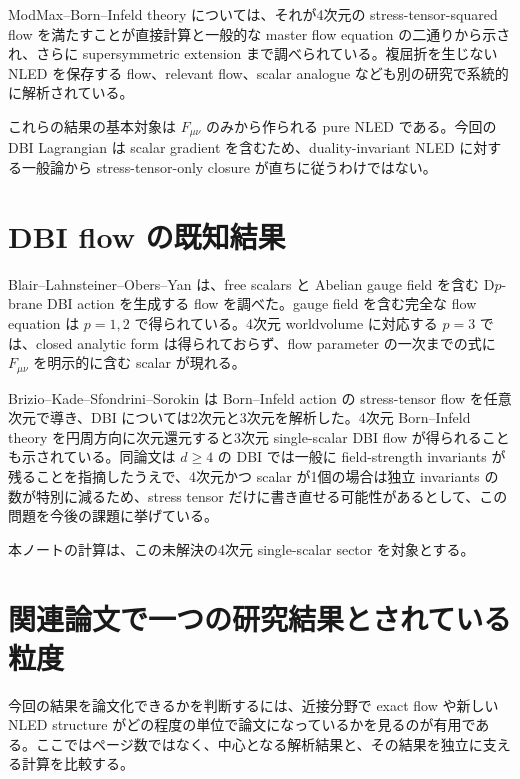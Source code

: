 \documentclass[a4paper,11pt]{ltjsreport}
\begin{document}
ModMax--Born--Infeld theory については、それが4次元の stress-tensor-squared flow を満たすことが直接計算と一般的な master flow equation の二通りから示され、さらに supersymmetric extension まで調べられている\cite{Ferko2022ModMax}。複屈折を生じない NLED を保存する flow、relevant flow、scalar analogue なども別の研究で系統的に解析されている\cite{Ferko2023b}。

これらの結果の基本対象は $F_{\mu\nu}$ のみから作られる pure NLED である。今回の DBI Lagrangian は scalar gradient を含むため、duality-invariant NLED に対する一般論から stress-tensor-only closure が直ちに従うわけではない。

\section{DBI flow の既知結果}

Blair--Lahnsteiner--Obers--Yan は、free scalars と Abelian gauge field を含む D$p$-brane DBI action を生成する flow を調べた\cite{Blair2025}。gauge field を含む完全な flow equation は $p=1,2$ で得られている。4次元 worldvolume に対応する $p=3$ では、closed analytic form は得られておらず、flow parameter の一次までの式に $F_{\mu\nu}$ を明示的に含む scalar が現れる。

Brizio--Kade--Sfondrini--Sorokin は Born--Infeld action の stress-tensor flow を任意次元で導き、DBI については2次元と3次元を解析した\cite{Brizio2026}。4次元 Born--Infeld theory を円周方向に次元還元すると3次元 single-scalar DBI flow が得られることも示されている。同論文は $d\geq4$ の DBI では一般に field-strength invariants が残ることを指摘したうえで、4次元かつ scalar が1個の場合は独立 invariants の数が特別に減るため、stress tensor だけに書き直せる可能性があるとして、この問題を今後の課題に挙げている。

本ノートの計算は、この未解決の4次元 single-scalar sector を対象とする。

\section{関連論文で一つの研究結果とされている粒度}

今回の結果を論文化できるかを判断するには、近接分野で exact flow や新しい NLED structure がどの程度の単位で論文になっているかを見るのが有用である。ここではページ数ではなく、中心となる解析結果と、その結果を独立に支える計算を比較する。
\end{document}
